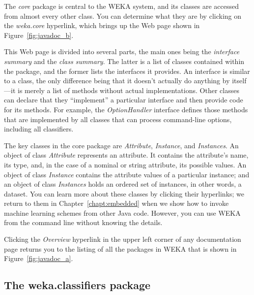 The \textit{core} package is central to the WEKA system, and its
classes are accessed from almost every other class. You can determine
what they are by clicking on the \textit{weka.core} hyperlink, which
brings up the Web page shown in Figure~\ref{fig:javadoc_b}.

This Web page is divided into several parts, the main ones being the
\textit{interface summary} and the \textit{class summary}. The latter
is a list of classes contained within the package, and the former
lists the interfaces it provides. An interface is similar to a class,
the only difference being that it doesn't actually do anything by
itself---it is merely a list of methods without actual
implementations. Other classes can declare that they ``implement'' a
particular interface and then provide code for its methods. For
example, the \textit{OptionHandler} interface defines those methods
that are implemented by all classes that can process command-line
options, including all classifiers.

The key classes in the core package are \textit{Attribute},
\textit{Instance}, and \textit{Instances}. An object of class
\textit{Attribute} represents an attribute. It contains the
attribute's name, its type, and, in the case of a nominal or string
attribute, its possible values. An object of class \textit{Instance}
contains the attribute values of a particular instance; and an object
of class \textit{Instances} holds an ordered set of instances, in
other words, a dataset. You can learn more about these classes by
clicking their hyperlinks; we return to them in
Chapter~\ref{chapt:embedded} when we show how to invoke machine
learning schemes from other Java code. However, you can use WEKA from
the command line without knowing the details.

Clicking the \textit{Overview} hyperlink in the upper left corner of
any documentation page returns you to the listing of all the packages
in WEKA that is shown in Figure~\ref{fig:javadoc_a}.

\subsection{The weka.classifiers package}

